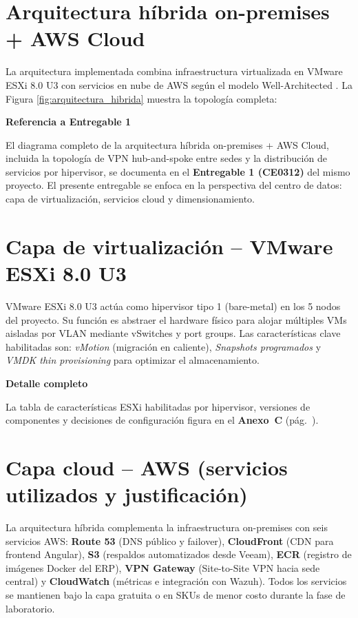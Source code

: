 \documentclass[11pt, a4paper, oneside]{report}
\newenvironment{notabox}[1]{%
  \begin{lrbox}{\notaboxsb}%
  \begin{minipage}{\dimexpr\textwidth-2\fboxsep\relax}%
  \vspace{4pt}\textcolor{upeu_dark}{\textbf{#1}}\\[2pt]\small%
}{%
  \vspace{4pt}%
  \end{minipage}%
  \end{lrbox}%
  \vspace{6pt}\par\noindent\colorbox{upeu_light}{\usebox{\notaboxsb}}\par\vspace{6pt}%
}
\begin{document}
\section{Arquitectura híbrida on-premises + AWS Cloud}

La arquitectura implementada combina infraestructura virtualizada en VMware ESXi 8.0 U3 \citep{vmwaresphere} con servicios en nube de AWS según el modelo Well-Architected \citep{awswellarchitected}. La Figura \ref{fig:arquitectura_hibrida} muestra la topología completa:

\begin{notabox}{Referencia a Entregable 1}
El diagrama completo de la arquitectura híbrida on-premises + AWS Cloud,
incluida la topología de VPN hub-and-spoke entre sedes y la distribución
de servicios por hipervisor, se documenta en el \textbf{Entregable 1 (CE0312)}
del mismo proyecto. El presente entregable se enfoca en la perspectiva
del centro de datos: capa de virtualización, servicios cloud y dimensionamiento.
\end{notabox}

\section{Capa de virtualización -- VMware ESXi 8.0 U3}

VMware ESXi 8.0 U3 actúa como hipervisor tipo 1 (bare-metal) en los 5 nodos del proyecto. Su función es abstraer el hardware físico para alojar múltiples VMs aisladas por VLAN mediante vSwitches y port groups. Las características clave habilitadas son: \textit{vMotion} (migración en caliente), \textit{Snapshots programados} y \textit{VMDK thin provisioning} para optimizar el almacenamiento.

\begin{notabox}{Detalle completo}
La tabla de características ESXi habilitadas por hipervisor, versiones de componentes y decisiones de configuración figura en el \textbf{Anexo~C} (pág.~\pageref{anex:vmware}).
\end{notabox}
\section{Capa cloud -- AWS (servicios utilizados y justificación)}

La arquitectura híbrida complementa la infraestructura on-premises con seis servicios AWS: \textbf{Route 53} (DNS público y failover), \textbf{CloudFront} (CDN para frontend Angular), \textbf{S3} (respaldos automatizados desde Veeam), \textbf{ECR} (registro de imágenes Docker del ERP), \textbf{VPN Gateway} (Site-to-Site VPN hacia sede central) y \textbf{CloudWatch} (métricas e integración con Wazuh). Todos los servicios se mantienen bajo la capa gratuita o en SKUs de menor costo durante la fase de laboratorio.
\end{document}

